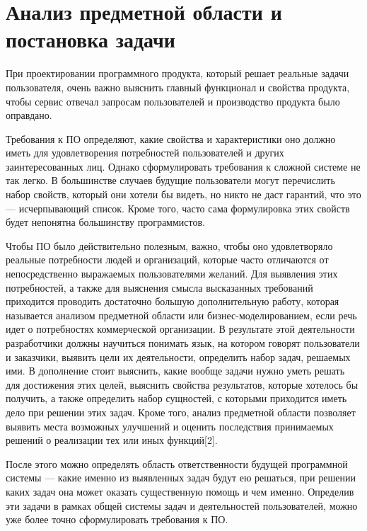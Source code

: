 

\section{Анализ предметной области и постановка задачи}

При проектировании программного продукта, который решает реальные задачи пользователя, очень важно выяснить главный функционал и свойства продукта, чтобы сервис отвечал запросам пользователей и производство продукта было оправдано.

Требования к ПО определяют, какие свойства и характеристики оно должно иметь для удовлетворения потребностей пользователей и других заинтересованных лиц. Однако сформулировать требования к сложной системе не так легко.
В большинстве случаев будущие пользователи могут перечислить набор свойств, который они хотели бы видеть, но никто не даст гарантий, что это — исчерпывающий список.
Кроме того, часто сама формулировка этих свойств будет непонятна большинству программистов.

Чтобы ПО было действительно полезным, важно, чтобы оно удовлетворяло реальные потребности людей и организаций, которые часто отличаются от непосредственно выражаемых пользователями желаний.
Для выявления этих потребностей, а также для выяснения смысла высказанных требований приходится проводить достаточно большую дополнительную работу, которая называется анализом предметной области или бизнес-моделированием, если речь идет о потребностях коммерческой организации.
В результате этой деятельности разработчики должны научиться понимать язык, на котором говорят пользователи и заказчики, выявить цели их деятельности, определить набор задач, решаемых ими.
В дополнение стоит выяснить, какие вообще задачи нужно уметь решать для достижения этих целей, выяснить свойства результатов, которые хотелось бы получить, а также определить набор сущностей, с которыми приходится иметь дело при решении этих задач.
Кроме того, анализ предметной области позволяет выявить места возможных улучшений и оценить последствия принимаемых решений о реализации тех или иных функций[2].

После этого можно определять область ответственности будущей программной системы — какие именно из выявленных задач будут ею решаться, при решении каких задач она может оказать существенную помощь и чем именно.
Определив эти задачи в рамках общей системы задач и деятельностей пользователей, можно уже более точно сформулировать требования к ПО.

